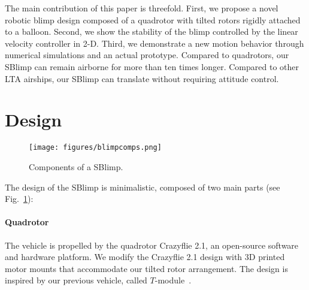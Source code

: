\documentclass[conference]{ieeeconf}
\newcommand{\qb}[1]{\todo[size=\footnotesize, color=orange!40]{#1}}
\begin{document}







The main contribution of this paper is threefold. 
First, we propose a novel robotic blimp design composed of a quadrotor with tilted rotors rigidly attached to a balloon.
Second, we show the stability of the blimp controlled by the linear velocity controller in 2-D.
Third, we demonstrate a new motion behavior through numerical simulations and an actual prototype.
Compared to quadrotors, our SBlimp can remain airborne for more than ten times longer. Compared to other LTA airships, our SBlimp can translate without requiring attitude control. 

%



\section{Design}
\begin{figure}[t]
    \centering
    \texttt{[image: figures/blimpcomps.png]}
    \caption{Components of a SBlimp.}
    \vspace{-1em}
    \label{fig:blimpcomp}
\end{figure}
\label{sec:design}
The design of the SBlimp is minimalistic, composed of two main parts (see Fig.~\ref{fig:blimpcomp}):
\paragraph{Quadrotor} The vehicle is propelled by the quadrotor Crazyflie 2.1, an open-source software and hardware platform. 
We modify the Crazyflie 2.1 design with 3D printed motor mounts that accommodate our tilted rotor arrangement. The design is inspired by our previous vehicle, called $T$-module~\cite{Xu2021}. 
    
\end{document}
